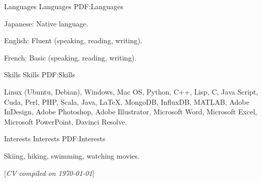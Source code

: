 \documentclass[letterpaper,MMMyyyy,nonstopmode]{simpleresumecv}
\newcommand{\CVNote}{CV compiled on {\today}}
\begin{document}
\begin{Body}
\Gap


\Section
{Languages}
{Languages}
{PDF:Languages}

\BulletItem
Japanese: Native language.

\Gap
\BulletItem
English: Fluent (speaking, reading, writing).

\Gap
\BulletItem
French: Basic (speaking, reading, writing).


\Section
{Skills}
{Skills}
{PDF:Skills}

\Entry
Linux (Ubuntu, Debian),
Windows,
Mac OS,
Python,
C++,
Lisp,
C,
Java Script,
Cuda,
Perl,
PHP,
Scala,
Java,
{\LaTeX},
MongoDB,
InfluxDB,
MATLAB,
Adobe InDesign,
Adobe Photoshop,
Adobe Illustrator,
Microsoft Word,
Microsoft Excel,
Microsoft PowerPoint,
Davinci Resolve.


\Section
{Interests}
{Interests}
{PDF:Interests}

\Entry
Skiing,
hiking,
swimming,
watching movies.

\end{Body}


\BigGap
\UseNoteFont%
\null\hfill%
[\textit{\CVNote}]
\end{document}
